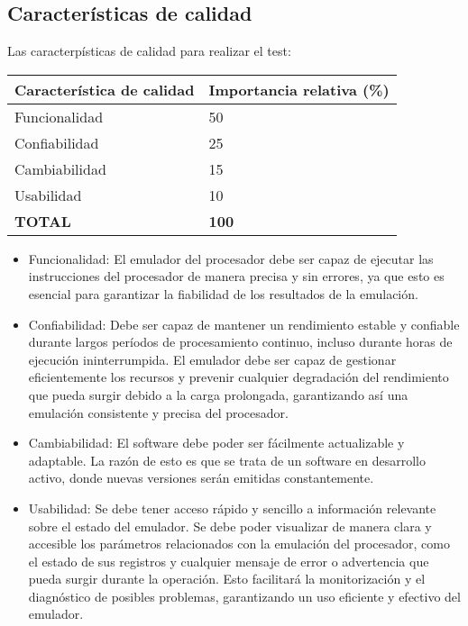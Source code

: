 \documentclass[
  11pt, %
  codirector, %
]{charter}
\begin{document}
\subsection{Características de calidad}
\label{sec:caracteristicas_de_calidad}

Las caracterpísticas de calidad para realizar el test:

\begin{table}[h!]
	\centering
	\begin{tabular}{ | m{5cm} | m{5cm} | }
		\hline
		\rowcolor{gray!50} %
		\textbf{Característica de calidad} & \textbf{Importancia relativa (\%)} \\ \hline
    Funcionalidad & 50 \\ \hline
    Confiabilidad & 25 \\ \hline
    Cambiabilidad & 15 \\ \hline
    Usabilidad & 10 \\ \hline
    \rowcolor{gray!50} %
		\textbf{TOTAL} & \textbf{100}
    \\ \hline
	\end{tabular}

\end{table}

\begin{itemize}
\item Funcionalidad: El emulador del procesador debe ser capaz de ejecutar las instrucciones del procesador de manera precisa y sin errores, ya que esto es esencial para garantizar la fiabilidad de los resultados de la emulación.
\item Confiabilidad: Debe ser capaz de mantener un rendimiento estable y confiable durante largos períodos de procesamiento continuo, incluso durante horas de ejecución ininterrumpida. El emulador debe ser capaz de gestionar eficientemente los recursos y prevenir cualquier degradación del rendimiento que pueda surgir debido a la carga prolongada, garantizando así una emulación consistente y precisa del procesador.
\item Cambiabilidad: El software debe poder ser fácilmente actualizable y adaptable. La razón de esto es que se trata de un software en desarrollo activo, donde nuevas versiones serán emitidas constantemente.
\item Usabilidad: Se debe tener acceso rápido y sencillo a información relevante sobre el estado del emulador. Se debe poder visualizar de manera clara y accesible los parámetros relacionados con la emulación del procesador, como el estado de sus registros y cualquier mensaje de error o advertencia que pueda surgir durante la operación. Esto facilitará la monitorización y el diagnóstico de posibles problemas, garantizando un uso eficiente y efectivo del emulador.
\end{itemize}
\end{document}
